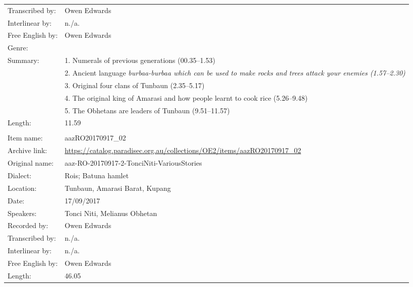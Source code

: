 \begin{longtable}{lL{.67\textwidth}}
Transcribed by:	& Owen Edwards\\
Interlinear by:	& n./a.\\
Free English by:& Owen Edwards\\
Genre:					& \\
Summary:				& 1. Numerals of previous generations (00.35--1.53)\\
								& 2. Ancient language \it{burbaa{\Q}-burbaa{\Q}} which can be used to make rocks and trees attack your enemies (1.57--2.30)\\
								& 3. Original four clans of Tunbaun (2.35--5.17)\\
								& 4. The original king of Amarasi and how people learnt to cook rice (5.26--9.48)\\
								& 5. The Obhetans are leaders of Tunbaun (9.51--11.57)\\
Length:					& 11.59\\ \lspbottomrule
{}					& \\
Item name:			& aazRO20170917{\_}02\\
Archive link:		& \url{https://catalog.paradisec.org.au/collections/OE2/items/aazRO20170917_02}\\
Original name:	& aaz-RO-20170917-2-TonciNiti-VariousStories\\
Dialect:				& Ro{\Q}is; Batuna hamlet \\
Location:				& Tunbaun, Amarasi Barat, Kupang \\
Date:						& 17/09/2017\\
Speakers:				& Tonci Niti, Melianus Obhetan\\
Recorded by:		& Owen Edwards\\
Transcribed by:	& n./a.\\
Interlinear by:	& n./a.\\
Free English by:& Owen Edwards\\
Length:					& 46.05\\
\end{longtable}

